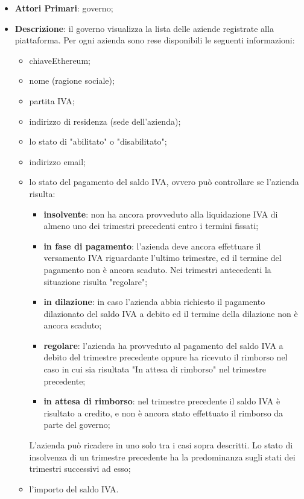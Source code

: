  \begin{itemize}
	\item \textbf{Attori Primari}: governo;
	\item \textbf{Descrizione}: il governo visualizza la lista delle aziende registrate alla piattaforma. Per ogni azienda sono rese disponibili le seguenti informazioni:
	\begin{itemize}
		\item chiave\glosp Ethereum\glo;
		\item nome (ragione sociale);
		\item partita IVA;
		\item indirizzo di residenza (sede dell'azienda);
		\item lo stato di "abilitato" o "disabilitato";
		\item indirizzo email;
		\item lo stato del pagamento del saldo IVA, ovvero può controllare se l'azienda risulta:
		\begin{itemize}
			\item \textbf{insolvente}: non ha ancora provveduto alla liquidazione IVA di almeno uno dei trimestri precedenti entro i termini fissati;
			\item \textbf{in fase di pagamento}: l'azienda deve ancora effettuare il versamento IVA riguardante l'ultimo trimestre, ed il termine del pagamento non è ancora scaduto. Nei trimestri antecedenti la situazione risulta "regolare";
			\item \textbf{in dilazione}: in caso l'azienda abbia richiesto il pagamento dilazionato del saldo IVA a debito ed il termine della dilazione non è ancora scaduto;
			\item \textbf{regolare}: l'azienda ha provveduto al pagamento del saldo IVA a debito del trimestre precedente oppure ha ricevuto il rimborso nel caso in cui sia risultata "In attesa di rimborso" nel trimestre precedente;
			\item \textbf{in attesa di rimborso}: nel trimestre precedente il saldo IVA è risultato a credito, e non è ancora stato effettuato il rimborso da parte del governo;
		\end{itemize}
	L'azienda può ricadere in uno solo tra i casi sopra descritti. Lo stato di insolvenza di un trimestre precedente ha la predominanza sugli stati dei trimestri successivi ad esso;
		\item l'importo del saldo IVA.
	\end{itemize}
	

\end{itemize}
